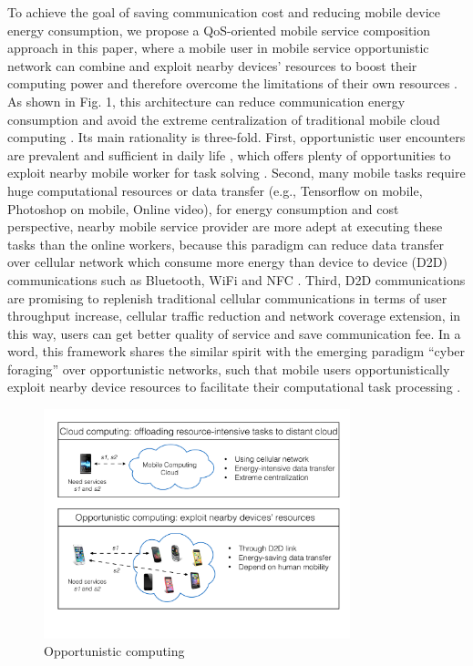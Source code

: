 \documentclass[10pt,journal,compsoc]{IEEEtran}
\begin{document}
To achieve the goal of saving communication cost and reducing mobile device energy consumption, we propose a QoS-oriented mobile service composition approach in this paper, where a mobile user in mobile service opportunistic network can combine and exploit nearby devices' resources to boost their computing power and therefore overcome the limitations of their own resources \cite{giordano2011human}. As shown in Fig. 1, this architecture can reduce communication energy consumption and avoid the extreme centralization of traditional mobile cloud computing \cite{giordano2011human}. Its main rationality is three-fold. First, opportunistic user encounters are prevalent and sufficient in daily life \cite{liu2013exploring}, which offers plenty of opportunities to exploit nearby mobile worker for task solving \cite{chang2015progressive,tt,tt}. Second, many mobile tasks require huge computational resources or data transfer (e.g., Tensorflow on mobile, Photoshop on mobile, Online video), for energy consumption and cost perspective, nearby mobile service provider are more adept at executing these tasks than the online workers, because this paradigm can reduce data transfer over cellular network which consume more energy than device to device (D2D) communications such as Bluetooth, WiFi and NFC \cite{balani2007energy}. Third, D2D communications are promising to replenish traditional cellular communications in terms of user throughput increase, cellular traffic reduction and network coverage extension, in this way, users can get better quality of service and save communication fee\cite{asadi2014survey}. In a word, this framework shares the similar spirit with the emerging paradigm “cyber foraging” over opportunistic networks, such that mobile users opportunistically exploit nearby device resources to facilitate their computational task processing \cite{shi2012serendipity,li2014can,zhang2015offloading}.

\begin{figure}[!t]
\centering
\includegraphics[width=3.5in]{./img/pic1.pdf}
\caption{Opportunistic computing}
\label{fig_opportunistic}
\end{figure}
\end{document}
